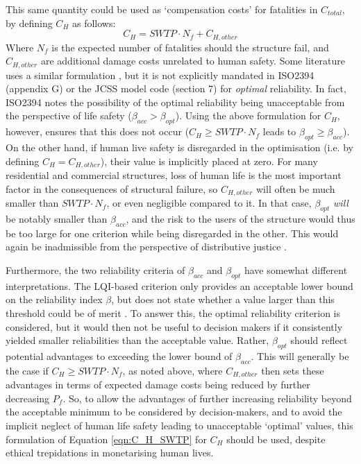 This same quantity could be used as `compensation costs' for fatalities in $C_{total}$, by defining $C_H$ as follows:
\begin{equation}
    \label{eqn:C_H_SWTP}
    C_H = SWTP \cdot N_f + C_{H,other}
\end{equation}
Where $N_f$ is the expected number of fatalities should the structure fail, and $C_{H,other}$ are additional damage costs unrelated to human safety.
Some literature uses a similar formulation \citep{Hingorani2023TowardsDesign}, but it is not explicitly mandated in ISO2394 \citep{iso2394} (appendix G) or the JCSS model code \cite{JCSS2000ProbabilisticDesign} (section 7) for \emph{optimal} reliability.
In fact, ISO2394 notes the possibility of the optimal reliability being unacceptable from the perspective of life safety ($\beta_{acc} > \beta_{opt}$).
Using the above formulation for $C_H$, however, ensures that this does not occur \citep{Fischer2019OptimalDesign} ($C_H \geq SWTP \cdot N_f$ leads to $\beta_{opt} \geq \beta_{acc}$).
On the other hand, if human live safety is disregarded in the optimisation (i.e. by defining $C_H = C_{H,other}$), their value is implicitly placed at zero.
For many residential and commercial structures, loss of human life is the most important factor in the consequences of structural failure, so $C_{H,other}$ will often be much smaller than $SWTP \cdot N_f$, or even negligible compared to it.
In that case, $\beta_{opt}$ \emph{will} be notably smaller than $\beta_{acc}$, and the risk to the users of the structure would thus be too large for one criterion while being disregarded in the other.
This would again be inadmissible from the perspective of distributive justice \citep{vandePoel2011EthicsEngineering}.

Furthermore, the two reliability criteria of $\beta_{acc}$ and $\beta_{opt}$ have somewhat different interpretations.
The LQI-based criterion only provides an acceptable lower bound on the reliability index $\beta$, but does not state whether a value larger than this threshold could be of merit \citep{Fischer2019OptimalDesign}.
To answer this, the optimal reliability criterion is considered, but it would then not be useful to decision makers if it consistently yielded smaller reliabilities than the acceptable value.
Rather, $\beta_{opt}$ should reflect potential advantages to exceeding the lower bound of $\beta_{acc}$.
This will generally be the case if $C_H \geq SWTP \cdot N_f$, as noted above, where $C_{H,other}$ then sets these advantages in terms of expected damage costs being reduced by further decreasing $P_f$.
So, to allow the advantages of further increasing reliability beyond the acceptable minimum to be considered by decision-makers, and to avoid the implicit neglect of human life safety leading to unacceptable `optimal' values, this formulation of Equation \ref{eqn:C_H_SWTP} for $C_H$ should be used, despite ethical trepidations in monetarising human lives.

